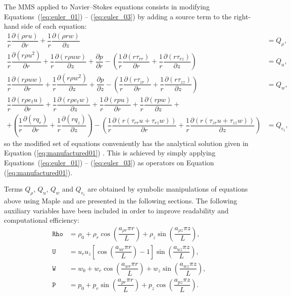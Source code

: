 \documentclass[10pt]{article}
\newcommand{\Diff}[2] {\dfrac{\partial( #1)}{\partial #2}}
\newcommand{\diff}[2] {\dfrac{\partial #1}{\partial #2}}
\newcommand{\Rho}{\,\mathtt{Rho}}
\newcommand{\PP}{\,\mathtt{P}}
\newcommand{\U}{\,\mathtt{U}}
\newcommand{\W}{\,\mathtt{W}}
\begin{document}
The MMS applied to Navier--Stokes equations consists in modifying Equations~(\ref{eq:euler_01}) -- (\ref{eq:euler_03}) by adding a source term to the right-hand side of each equation:
\begin{equation}
 \label{eq:ns2d_mod}
\begin{split}
 \dfrac{1}{r} \Diff{\rho r u}{r}+ \dfrac{1}{r}\Diff{\rho r w}{z} &=Q_\rho,\\
\dfrac{1}{r}\Diff{r \rho u^2 }{r}+ \dfrac{1}{r}\Diff{r \rho u w }{z}+\diff{p}{r}-\left(\dfrac{1}{r}\Diff{r \tau_{rr}}{r}+\dfrac{1}{r}\Diff{r \tau_{rz}}{z}\right) &= Q_u,\\
\dfrac{1}{r}\Diff{r \rho  u w}{r}+ \dfrac{1}{r}\Diff{r \rho w^2 }{z}+\diff{p}{z}- \left(\dfrac{1}{r}\Diff{r \tau_{zr}}{r}+\dfrac{1}{r}\Diff{r \tau_{zz}}{z}\right) &= Q_w,\\
\dfrac{1}{r}\Diff{r \rho e_t u}{ r}+\dfrac{1}{r}\Diff{r \rho e_t w}{z} +\dfrac{1}{r}\Diff{r p  u}{ r}+\dfrac{1}{r}\Diff{r p w}{z}+&\\
+\left(\dfrac{1}{r}\Diff{r q_r }{r} + \dfrac{1}{r}\Diff{r q_z }{z}\right) -\left(\dfrac{1}{r}\Diff{r( \tau_{rr} u + \tau_{rz} w ) }{r} + \dfrac{1}{r}\Diff{ r(\tau_{zr} u + \tau_{zz} w ) }{z}\right) &=Q_{e_t},
\end{split}
\end{equation}
%
%
so the modified set of equations conveniently has the analytical solution given in Equation (\ref{eq:manufactured01}) \cite{Roy2002}. This is achieved by simply applying Equations~(\ref{eq:euler_01}) -- (\ref{eq:euler_03}) as operators on Equation (\ref{eq:manufactured01}).

Terms $Q_\rho$, $Q_u$,  $Q_w$ and $Q_{e_t}$ are obtained by symbolic manipulations of equations above using Maple and are presented in the following sections. The following auxiliary variables have been included in order to improve readability and computational efficiency:
\begin{equation*}
 \begin{split}
\label{eq:aux_}
\Rho &= \rho_0+\rho_r \cos\left(\dfrac{a_{\rho r} \pi r}{L}\right)+\rho_z \sin\left(\dfrac{a_{\rho z} \pi z}{L}\right),\\
\U &= u_r u_z \left[\cos\left(\dfrac{a_{ur} \pi r}{L}\right)-1\right]\sin\left(\dfrac{a_{uz} \pi z}{L}\right),\\
\W &=w_0+w_r \cos\left(\dfrac{a_{w r} \pi r}{L}\right)+w_z \sin\left(\dfrac{a_{w z} \pi z}{L}\right),\\
\PP &=p_0+p_r \sin\left(\dfrac{a_{p r} \pi r}{L}\right)+p_z \cos\left(\dfrac{a_{p z} \pi z}{L}\right).
\end{split}
\end{equation*}
\end{document}
